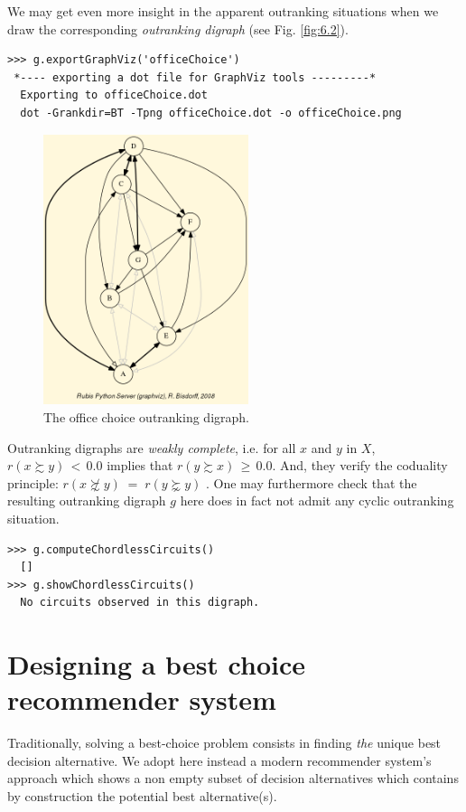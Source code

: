 We may get even more insight in the apparent outranking situations when we draw the corresponding \emph{outranking digraph} (see Fig. \ref{fig:6.2}).
\begin{lstlisting}
>>> g.exportGraphViz('officeChoice')
 *---- exporting a dot file for GraphViz tools ---------*
  Exporting to officeChoice.dot
  dot -Grankdir=BT -Tpng officeChoice.dot -o officeChoice.png
\end{lstlisting}
\begin{figure}[h]
\sidecaption
\includegraphics[width=6cm]{Figures/officeChoice.png}
\caption{The office choice outranking digraph.}
\label{fig:6.3}       %
\end{figure}

Outranking digraphs are \emph{weakly complete}, i.e. for all $x$ and $y$ in $X$, $r(x \succsim y)\, <\, 0.0$ implies that $r(y \succsim x)\, \geq\, 0.0$. And, they verify the coduality principle:  $r(x \not\succsim y) \;=\; r(y \succnsim y)$ \citep{BIS-2013}. One may furthermore check that the resulting outranking digraph $g$ here does in fact not admit any cyclic outranking situation.
\begin{lstlisting}
>>> g.computeChordlessCircuits()
  []
>>> g.showChordlessCircuits()
  No circuits observed in this digraph.
\end{lstlisting}

\section{Designing a best choice recommender system}
\label{sec:6.3}

Traditionally, solving a best-choice problem consists in finding \emph{the} unique best decision alternative. We adopt here instead a modern recommender system’s approach which shows a non empty subset of decision alternatives which contains by construction the potential best alternative(s).

